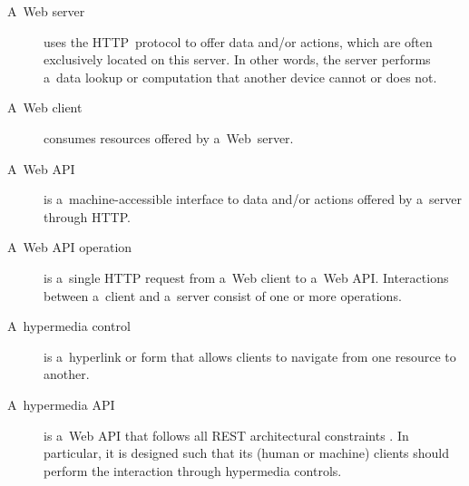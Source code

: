 \begin{description}\label{api}
  \item[A~Web server] uses the HTTP~protocol \cite{HTTP}
    to offer data and/or actions,
    which are often exclusively located on this server.
    In other words, the server performs a~data lookup or computation
    that another device cannot or does not.
  \item[A~Web client] consumes resources offered by a~Web~server.
  \item[A~Web API] is a~machine-accessible interface
    to data and/or actions offered by a~server through HTTP.
  \item[A~Web API operation]
    is a~single HTTP request from a~Web client to a~Web API.
    Interactions between a~client and a~server consist of one or more operations.
  \item[A~hypermedia control] is a~hyperlink or form
    that allows clients to navigate from one resource to another.
  \item[A~hypermedia API] is a~Web API
    that follows all REST architectural constraints \cite{REST}.
    In particular, it is designed such that its (human or machine) clients
    should perform the interaction through hypermedia controls.
\end{description}

% 


